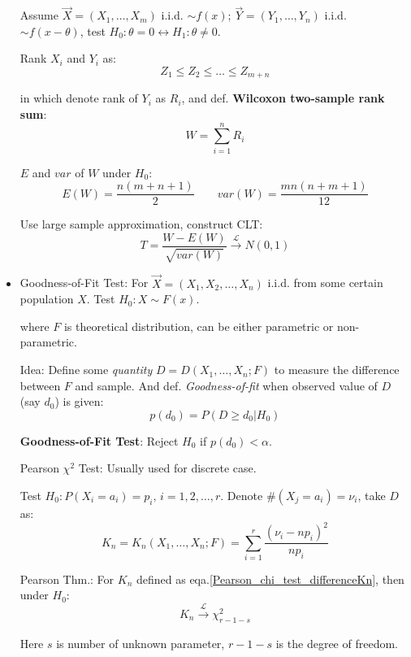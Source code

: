 \begin{itemize}
        Assume $\vec{X}=(X_1,\ldots,X_m)$ i.i.d. $\sim f(x)$; $\vec{Y}=(Y_1,\ldots,Y_n)$ i.i.d. $\sim f(x-\theta)$, test $H_0:\theta=0\longleftrightarrow H_1:\theta\neq 0$.

        Rank $X_i$ and $Y_i$ as:
        \[
            Z_1\leq Z_2\leq\ldots\leq Z_{m+n}
        \]

        in which denote rank of $Y_i$ as $R_i$, and def. \textbf{Wilcoxon two-sample rank sum}:
        \[W=\sum_{i=1}^n R_i\]

        $E$ and $var$ of $W$ under $H_0$:
\[E(W)=\frac{n(m+n+1)}{2}\qquad var(W)=\frac{mn(n+m+1)}{12}\]

        Use large sample approximation, construct CLT:
        \[
            T=\frac{W-E(W)}{\sqrt{var(W)}}\xrightarrow[]{\mathscr{L}}N(0,1)
        \]







        \item Goodness-of-Fit Test: For $\vec{X}=(X_1,X_2,\ldots,X_n)$ i.i.d. from some certain population $X$. Test $H_0:X\sim F(x)$.
        
        where $F$ is theoretical distribution, can be either parametric or non-parametric.

        Idea: Define some \textit{quantity} $D=D(X_1,\ldots,X_n;F)$ to measure the difference between $F$ and sample. And def. \textit{Goodness-of-fit} when observed value of $D$ (say $d_0$) is given:
        \[p(d_0)=P(D\geq d_0|H_0)\]

        \textbf{Goodness-of-Fit Test}: Reject $H_0$ if $p(d_0)<\alpha$.


            Pearson $\chi^2$ Test: Usually used for discrete case. 
            
            Test $H_0:P(X_i=a_i)=p_i,\, i=1,2,\ldots,r$. Denote $\#(X_j=a_i)=\nu_i$, take $D$ as:
            \begin{equation}\label{Pearson_chi_test_differenceKn}
                K_n=K_n(X_1,\ldots,X_n;F)=\sum_{i=1}^r\frac{(\nu_i-np_i)^2}{np_i}
            \end{equation}

            Pearson Thm.: For $K_n$ defined as eqa.\ref{Pearson_chi_test_differenceKn}, then under $H_0$:
            \[
                K_n\xrightarrow[]{\mathscr{L}}\chi^2_{r-1-s}
            \] 

            Here $s$ is number of unknown parameter, $r-1-s$ is the degree of freedom.


\end{itemize}
